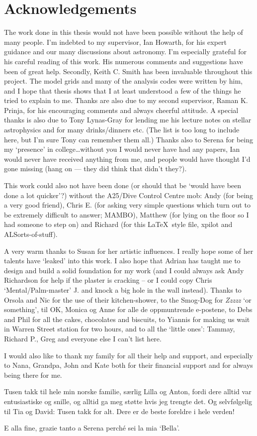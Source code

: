 \chapter*{Acknowledgements}

The work done in this thesis would not have been possible without the
help of many people. I'm indebted to my supervisor, Ian Howarth, for
his expert guidance and our many discussions about astronomy. I'm
especially grateful for his careful reading of this work. His
numerous comments and suggestions have been of great help. Secondly,
Keith C. Smith has been invaluable throughout this project. The model
grids and many of the analysis codes were written by him, and I hope
that thesis shows that I at least understood a few of the things he
tried to explain to me. Thanks are also due to my second supervisor,
Raman K. Prinja, for his encouraging comments and always cheerful
attitude. A special thanks is also due to Tony Lynas-Gray for lending
me his lecture notes on stellar astrophysics and for many
drinks/dinners etc. (The list is too long to include here, but I'm
sure Tony can remember them all.) Thanks also to Serena for being my
`presence' in college\ldots without you I would never have had any
papers, Ian would never have received anything from me, and people
would have thought I'd gone missing (hang on --- they did think that
didn't they?).

This work could also not have been done (or should that be `would have
been done a lot quicker'?) without the A25/Dive Control Centre mob:
Andy (for being a very good friend), Chris E. (for asking very simple
questions which turn out to be extremely difficult to answer; MAMBO),
Matthew (for lying on the floor so I had someone to step on) and
Richard (for this \LaTeX\ style file, xpilot and ALSorts-of-stuff).

A very warm thanks to Susan for her artistic influences. I really hope
some of her talents have `leaked' into this work. I also hope that
Adrian has taught me to design and build a solid foundation for my
work (and I could always ask Andy Richardson for help if the plaster
is cracking -- or I could copy Chris `Mental/Palm-master' J. and
knock a big hole in the wall instead). Thanks to Orsola and Nic for
the use of their kitchen-shower, to the Smog-Dog for \emph{Zzzzz} `or
something', til OK, Monica og Anne for alle de oppmuntrende e-postene,
to Debs and Phil for all the cakes, chocolates and biscuits, to
Yiannis for making us wait in Warren Street station for two hours, and
to all the `little ones': Tammay, Richard P., Greg and everyone else I
can't list here.

I would also like to thank my family for all their help and support,
and especially to Nana, Grandpa, John and Kate both for their
financial support and for always being there for me.

Tusen takk til hele min norske familie, s\ae rlig Lilla og Anton, fordi
dere alltid var entusiastiske og snille, og alltid ga meg st\o tte
hvis jeg trengte det. Og selvf\o lgelig til Tia og David: Tusen takk for
alt. Dere er de beste foreldre i hele verden!

E alla fine, grazie tanto a Serena perch\'e sei la mia `Bella'.
